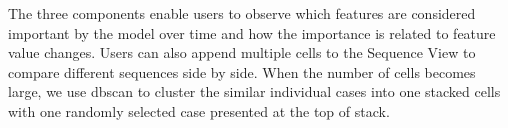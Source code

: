 The three components enable users to observe which features are considered important by the model over time and how the importance is related to feature value changes.
Users can also append multiple cells to the Sequence View to compare different sequences side by side. 
When the number of cells becomes large, we use dbscan to cluster the similar individual cases into one stacked cells with one randomly selected case presented at the top of stack.